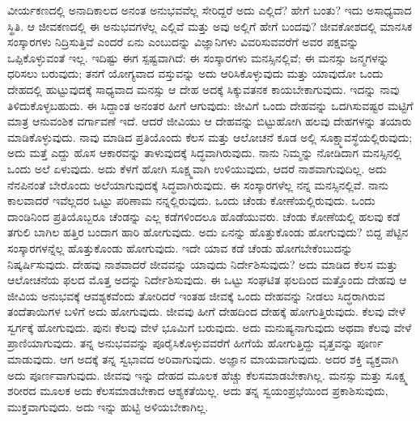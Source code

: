 \vskip 0.2cm

ವೀರ್ಯಕಣದಲ್ಲಿ ಅನಾದಿಕಾಲದ ಅನಂತ ಅನುಭವವೆಲ್ಲ ಸೇರಿದ್ದರೆ ಅದು ಎಲ್ಲಿದೆ? ಹೇಗೆ ಬಂತು? ಇದು ಅಸಾಧ್ಯವಾದ ಸ್ಥಿತಿ. ಆ ಜೀವಕಣದಲ್ಲಿ ಈ ಅನುಭವಗಳೆಲ್ಲ ಎಲ್ಲಿವೆ ಮತ್ತು ಅವು ಅಲ್ಲಿಗೆ ಹೇಗೆ ಬಂದವು? ಜೀವಕೋಶದಲ್ಲಿ ಮಾನಸಿಕ ಸಂಸ್ಕಾರಗಳು ನಿದ್ರಿಸುತ್ತಿವೆ ಎಂದರೆ ಏನು ಎಂಬುದನ್ನು ವಿಜ್ಞಾನಿಗಳು ವಿವರಿಸುವವರೆಗೆ ಅವರ ಪಕ್ಷವನ್ನು ಒಪ್ಪಿಕೊಳ್ಳುವಂತೆ ಇಲ್ಲ. ಇದಿಷ್ಟು ಈಗ ಸ್ಪಷ್ಟವಾಗಿದೆ: ಈ ಸಂಸ್ಕಾರಗಳು ಮನಸ್ಸಿನಲ್ಲಿವೆ; ಈ ಮನಸ್ಸು ಜನ್ಮಗಳನ್ನು ಧರಿಸಲು ಬರುವುದು; ತನಗೆ ಯೋಗ್ಯವಾದ ವಸ್ತುವನ್ನು ಅದು ಆರಿಸಿಕೊಳ್ಳುವುದು ಮತ್ತು ಯಾವುದೋ ಒಂದು ದೇಹದಲ್ಲಿ ಹುಟ್ಟುವುದಕ್ಕೆ ಸಾಧ್ಯವಾದ ಮನಸ್ಸು ಆ ದೇಹ ಅದಕ್ಕೆ ಸಿಕ್ಕುವತನಕ ಕಾಯಬೇಕಾಗುವುದು. ಇದನ್ನು ನಾವು ತಿಳಿದುಕೊಳ್ಳಬಹುದು. ಈ ಸಿದ್ದಾಂತ ಅನಂತರ ಹೀಗೆ ಆಗುವುದು: ಜೀವಿಗೆ ಒಂದು ದೇಹವನ್ನು ಒದಗಿಸುವಷ್ಟರ ಮಟ್ಟಿಗೆ ಮಾತ್ರ ಆನುವಂಶಿಕ ವರ್ಗಾವಣೆ ಇದೆ. ಆದರೆ ಜೀವಿಯು ಆ ದೇಹವನ್ನು ಬಿಟ್ಟುಹೋಗಿ ಹಲವು ದೇಹಗಳನ್ನು ತಯಾರು ಮಾಡಿಕೊಳ್ಳುವುದು. ನಾವು ಮಾಡಿದ ಪ್ರತಿಯೊಂದು ಕೆಲಸ ಮತ್ತು ಆಲೋಚನೆ ಕೂಡ ಅಲ್ಲಿ ಸೂಕ್ಷ್ಮಾವಸ್ಥೆಯಲ್ಲಿರುವುದು; ಅದು ಮತ್ತೆ ಎದ್ದು ಹೊಸ ಆಕಾರವನ್ನು ತಾಳುವುದಕ್ಕೆ ಸಿದ್ಧವಾಗಿರುವುದು. ನಾನು ನಿಮ್ಮನ್ನು ನೋಡಿದಾಗ ಮನಸ್ಸಿನಲ್ಲಿ ಒಂದು ಅಲೆ ಏಳುವುದು. ಅದು ಕೆಳಗೆ ಹೋಗಿ ಸೂಕ್ಷ್ಮವಾಗಿ ಉಳಿಯುವುದು, ಆದರೆ ನಾಶವಾಗುವುದಿಲ್ಲ. ಅದು ನೆನಪಿನಂತೆ ಬೇರೊಂದು ಅಲೆಯಾಗುವುದಕ್ಕೆ ಸಿದ್ಧವಾಗಿರುವುದು. ಈ ಸಂಸ್ಕಾರಗಳೆಲ್ಲ ನನ್ನ ಮನಸ್ಸಿನಲ್ಲಿವೆ. ನಾನು ಕಾಲವಾದರೆ ಇವೆಲ್ಲದರ ಒಟ್ಟು ಪರಿಣಾಮ ನನ್ನಲ್ಲಿರುವುದು. ಒಂದು ಚೆಂಡು ಕೋಣೆಯಲ್ಲಿರುವುದು. ಒಂದು ದಾಂಡಿನಿಂದ ಪ್ರತಿಯೊಬ್ಬರೂ ಚೆಂಡನ್ನು ಎಲ್ಲ ಕಡೆಗಳಿಂದಲೂ ಹೊಡೆಯುವರು. ಚೆಂಡು ಕೋಣೆಯಲ್ಲಿ ಹಲವು ಕಡೆ ತಗುಲಿ ಬಾಗಿಲ ಹತ್ತಿರ ಬಂದಾಗ ಹಾರಿ ಹೋಗುವುದು. ಅದು ಏನನ್ನು ಹೊತ್ತುಕೊಂಡು ಹೋಗುವುದು? ಬಿದ್ದ ಪೆಟ್ಟಿನ ಸಂಸ್ಕಾರಗಳನ್ನೆಲ್ಲ ಹೊತ್ತುಕೊಂಡು ಹೋಗುವುದು. ಇದೇ ಯಾವ ಕಡೆ ಚೆಂಡು ಹೋಗಬೇಕೆಂಬುದನ್ನು ನಿಷ್ಕರ್ಷಿಸುವುದು. ದೇಹವು ನಾಶವಾದರೆ ಜೀವವನ್ನು ಯಾವುದು ನಿರ್ದೇಶಿಸುವುದು? ಅದು ಮಾಡಿದ ಕೆಲಸ ಮತ್ತು ಆಲೋಚನೆಯ ಫಲದ ಮೊತ್ತ ಅದನ್ನು ನಿರ್ದೇಶಿಸುವುದು. ಈ ಒಟ್ಟು ಸಂಘಟಿತ ಫಲದಿಂದ ಮತ್ತೊಂದು ದೇಹವು ಆ ಜೀವಿಯ ಅನುಭವಕ್ಕೆ ಆವಶ್ಯಕವೆಂದು ತೋರಿದರೆ ಇಂತಹ ಜೀವಕ್ಕೆ ಒಂದು ದೇಹವನ್ನು ನೀಡಲು ಸಿದ್ಧರಾಗಿರುವ ತಂದೆತಾಯಿಗಳ ಬಳಿಗೆ ಅದು ಹೋಗುವುದು. ಜೀವವು ಹೀಗೆ ದೇಹದಿಂದ ದೇಹಕ್ಕೆ ಹೋಗುತ್ತಿರುವುದು. ಕೆಲವು ವೇಳೆ ಸ್ವರ್ಗಕ್ಕೆ ಹೋಗುವುದು. ಪುನಃ ಕೆಲವು ವೇಳೆ ಭೂಮಿಗೆ ಬರುವುದು. ಅದು ಮನುಷ್ಯನಾಗುವುದು ಅಥವಾ ಕೆಲವು ವೇಳೆ ಪ್ರಾಣಿಯಾಗುವುದು. ತನ್ನ ಅನುಭವವನ್ನು ಪೂರೈಸಿಕೊಳ್ಳುವವರೆಗೆ ಹೀಗೆಯೆ ಹೋಗುತ್ತಿದ್ದು ವೃತ್ತವನ್ನು ಪೂರ್ಣ ಮಾಡುವುದು. ಆಗ ಅದಕ್ಕೆ ತನ್ನ ಸ್ವಭಾವದ ಅರಿವಾಗುವುದು. ಅಜ್ಞಾನ ಮಾಯವಾಗುವುದು. ಅದರ ಶಕ್ತಿ ವ್ಯಕ್ತವಾಗಿ ಅದು ಪೂರ್ಣವಾಗುವುದು. ಜೀವವು ಇನ್ನು ದೇಹದ ಮೂಲಕ ಹೆಚ್ಚು ಕೆಲಸಮಾಡಬೇಕಾಗಿಲ್ಲ. ಮನಸ್ಸು ಮತ್ತು ಸೂಕ್ಷ್ಮ ಶರೀರದ ಮೂಲಕ ಅದು ಕೆಲಸಮಾಡಬೇಕಾದ ಆಶ್ಯಕತೆಯಿಲ್ಲ. ಅದು ತನ್ನ ಸ್ವಯಂಪ್ರಭೆಯಿಂದ ಪ್ರಕಾಶಿಸುವುದು, ಮುಕ್ತವಾಗುವುದು. ಅದು ಇನ್ನು ಹುಟ್ಟಿ ಅಳಿಯಬೇಕಾಗಿಲ್ಲ.

\vskip 0.2cm

